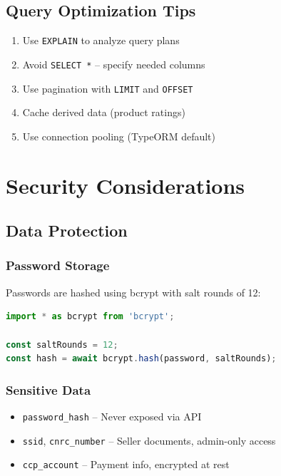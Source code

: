 \documentclass[12pt,a4paper]{report}
\begin{document}
\section{Query Optimization Tips}

\begin{enumerate}
    \item Use \texttt{EXPLAIN} to analyze query plans
    \item Avoid \texttt{SELECT *} -- specify needed columns
    \item Use pagination with \texttt{LIMIT} and \texttt{OFFSET}
    \item Cache derived data (product ratings)
    \item Use connection pooling (TypeORM default)
\end{enumerate}

\chapter{Security Considerations}

\section{Data Protection}

\subsection{Password Storage}
Passwords are hashed using bcrypt with salt rounds of 12:

\begin{lstlisting}[language=TypeScript, caption=Password Hashing Example]
import * as bcrypt from 'bcrypt';

const saltRounds = 12;
const hash = await bcrypt.hash(password, saltRounds);
\end{lstlisting}

\subsection{Sensitive Data}
\begin{itemize}
    \item \texttt{password\_hash} -- Never exposed via API
    \item \texttt{ssid}, \texttt{cnrc\_number} -- Seller documents, admin-only access
    \item \texttt{ccp\_account} -- Payment info, encrypted at rest
\end{itemize}
\end{document}
